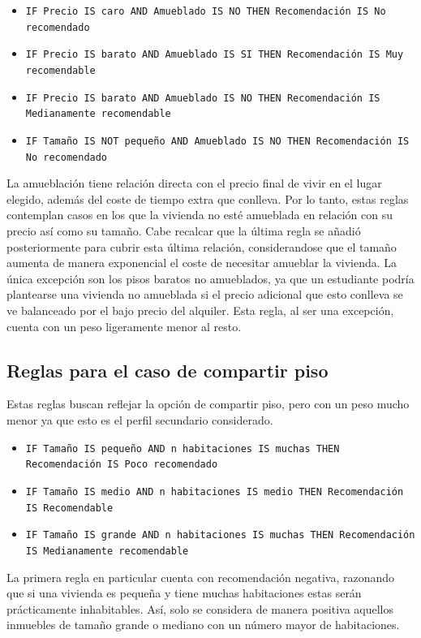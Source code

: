 \documentclass[12pt]{report} %
\begin{document}
    \begin{itemize}
        \item \texttt{IF Precio IS caro AND Amueblado IS NO THEN Recomendación IS No recomendado}
        \item \texttt{IF Precio IS barato AND Amueblado IS SI THEN Recomendación IS Muy recomendable}
        \item \texttt{IF Precio IS barato AND Amueblado IS NO THEN Recomendación IS Medianamente recomendable}
        \item \texttt{IF Tamaño IS NOT pequeño AND Amueblado IS NO THEN Recomendación IS No recomendado}
    \end{itemize}

    La amueblación tiene relación directa con el precio final de vivir en el lugar elegido, 
    además del coste de tiempo extra que conlleva. Por lo tanto, estas reglas contemplan casos en 
    los que la vivienda no esté amueblada en relación con su precio así como su tamaño. Cabe recalcar
    que la última regla se añadió posteriormente para cubrir esta última relación, considerandose que el 
    tamaño aumenta de manera exponencial el coste de necesitar amueblar la vivienda. La única excepción
    son los pisos baratos no amueblados, ya que un estudiante podría plantearse una vivienda no amueblada 
    si el precio adicional que esto conlleva se ve balanceado por el bajo precio del alquiler. Esta regla, 
    al ser una excepción, cuenta con un peso ligeramente menor al resto. 

    \subsection{Reglas para el caso de compartir piso}
    Estas reglas buscan reflejar la opción de compartir piso, pero con un peso mucho menor ya que esto 
    es el perfil secundario considerado. 

    \begin{itemize}
        \item \texttt{IF Tamaño IS pequeño AND n habitaciones IS muchas THEN Recomendación IS Poco recomendado}
        \item \texttt{IF Tamaño IS medio AND n habitaciones IS medio THEN Recomendación IS Recomendable}
        \item \texttt{IF Tamaño IS grande AND n habitaciones IS muchas THEN Recomendación IS Medianamente recomendable}
    \end{itemize}

    La primera regla en particular cuenta con recomendación negativa, razonando que si una vivienda es pequeña 
    y tiene muchas habitaciones estas serán prácticamente inhabitables. Así, solo se considera de manera 
    positiva aquellos inmuebles de tamaño grande o mediano con un número mayor de habitaciones.
\end{document}
